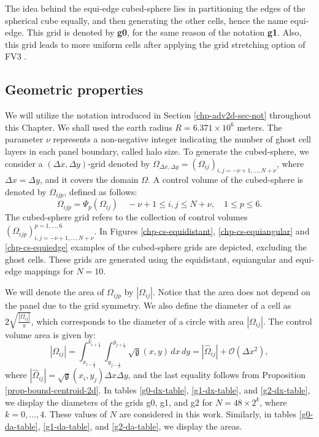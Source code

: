 The idea behind the equi-edge cubed-sphere lies in partitioning the edges of the spherical cube equally,
and then generating the other cells, hence the name equi-edge.
This grid is denoted by \textbf{g0}, for the same reason of the notation \textbf{g1}.
Also, this grid leads to more uniform cells after applying the grid stretching option of FV3 \citep{harris:2016, chen:2021}.

\subsection{Geometric properties}
\label{cs-geo}
We will utilize the notation introduced in Section \ref{chp-adv2d-sec-not} throughout this Chapter.
We shall used the earth radius $R = 6.371 \times 10^6$ meters.
The parameter $\nu$ represents a non-negative integer indicating the number of ghost cell layers in each panel boundary, called halo size.
To generate the cubed-sphere, we consider a $(\Delta x, \Delta y)$-grid denoted by 
$\Omega_{\Delta x, \Delta y} = (\Omega_{ij})_{i,j=-\nu+1,\ldots,N+\nu}$, 
where $\Delta x = \Delta y$, and it covers the domain $\Omega$. 
A control volume of the cubed-sphere is denoted by $\Omega_{ijp}$, defined as follows:
\begin{equation*}
	\Omega_{ijp} = \Psi_p(\Omega_{ij})
	\quad -\nu+1 \leq i, j \leq N+\nu, \quad 1 \leq p \leq 6.
\end{equation*}
The cubed-sphere grid refers to the collection of control volumes 
$(\Omega_{ijp})_{i,j=-\nu+1,\ldots,N+\nu}^{p=1,\ldots,6}$. 
In Figures \ref{chp-cs-equidistant}, \ref{chp-cs-equiangular} and \ref{chp-cs-equiedge} examples of the cubed-sphere grids are depicted,
excluding the ghost cells.
These grids are generated using the equidistant, equiangular and equi-edge mappings for $N=10$.

We will denote the area of $\Omega_{ijp}$ by $|\Omega_{ij}|$.
Notice that the area does not depend on the panel due to the grid symmetry.
We also define the diameter of a cell as $2\sqrt{\frac{|\Omega_{ij}|}{\pi}}$, which corresponds to the diameter of a circle with area $|\Omega_{ij}|$.
The control volume area is given by:
\begin{equation}
	\label{chp4-area}
	|\Omega_{ij}| = \int_{x_{i-\frac{1}{2}}}^{x_{i+\frac{1}{2}}} \int_{y_{j-\frac{1}{2}}}^{y_{j+\frac{1}{2}}}{\sqrt{\mathfrak{g}}(x,y)} \,dx \,dy = 
	|\hat{\Omega}_{ij}| + \mathcal{O}(\Delta x^2),
\end{equation}
where $|\hat{\Omega}_{ij}| = \sqrt{\mathfrak{g}}(x_i,y_j) \Delta x \Delta y$,
and the last equality follows from Proposition \ref{prop-bound-centroid-2d}.
In tables \ref{g0-dx-table}, \ref{g1-dx-table}, and \ref{g2-dx-table},
we display the diameters of the grids g0, g1, and g2 for $N=48\times 2^k$, 
where $k = 0,\ldots, 4$. These values of $N$ are considered in this work.
Similarly, in tables \ref{g0-da-table}, \ref{g1-da-table}, and \ref{g2-da-table}, we display the areas.



